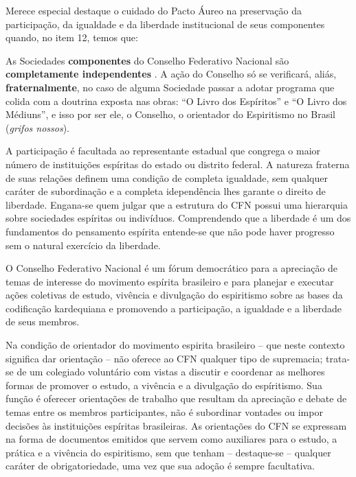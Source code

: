 Merece especial destaque o cuidado do Pacto Áureo na preservação da participação, da igualdade e da liberdade institucional de seus componentes quando, no item 12, temos que:


\begin{citacao}
As Sociedades \textbf{componentes} do Conselho Federativo Nacional são \textbf{completamente independentes} . A ação do Conselho só se verificará, aliás, \textbf{fraternalmente}, no caso de alguma Sociedade passar a adotar programa que colida com a doutrina exposta nas obras: “O Livro dos Espíritos” e “O Livro dos Médiuns”, e isso por ser ele, o Conselho, o orientador do Espiritismo no Brasil (\emph{grifos nossos}).
\end{citacao}

A participação é facultada ao representante estadual que congrega o maior número de instituições espíritas do estado ou distrito federal. A natureza fraterna de suas relações definem uma condição de completa igualdade, sem qualquer caráter de subordinação e a completa idependência lhes garante o direito de liberdade. Engana-se quem julgar que a estrutura do CFN possui uma hierarquia sobre sociedades espíritas ou indivíduos. Comprendendo que a liberdade é um dos fundamentos do pensamento espírita entende-se que não pode haver progresso sem o natural exercício da liberdade.  

O Conselho Federativo Nacional é um fórum democrático para a apreciação de temas de interesse do movimento espírita brasileiro e para planejar e executar ações coletivas de estudo, vivência e divulgação do espiritismo sobre as bases da codificação kardequiana e promovendo a participação, a igualdade e a liberdade de seus membros. 

Na condição de orientador do movimento espirita brasileiro -- que neste contexto significa dar orientação --  não oferece ao CFN qualquer tipo de supremacia; trata-se de um colegiado voluntário com vistas a discutir e coordenar as melhores formas de promover o estudo, a vivência e a divulgação do espíritismo. Sua função é oferecer orientações de trabalho que resultam da apreciação e debate de temas entre os membros participantes, não é subordinar vontades ou impor decisões às instituições espíritas brasileiras. As orientações do CFN se expressam na forma de documentos emitidos que servem como auxiliares para o estudo, a prática e a vivência do espiritismo, sem que tenham -- destaque-se -- qualquer caráter de obrigatoriedade, uma vez que sua adoção é sempre facultativa.

